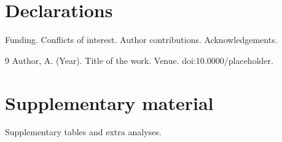 \documentclass[11pt]{article}
\begin{document}
\section*{Declarations}
Funding. Conflicts of interest. Author contributions. Acknowledgements.

\begin{thebibliography}{9}
 Author, A. (Year). Title of the work. Venue.
  doi:10.0000/placeholder.
\end{thebibliography}

\appendix
\section{Supplementary material}
Supplementary tables and extra analyses.
\end{document}
